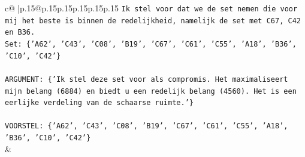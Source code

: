 \documentclass{article}
\begin{document}
{\begin{supertabular}{c@{$\;$}|p{.15\linewidth}@{}p{.15\linewidth}p{.15\linewidth}p{.15\linewidth}p{.15\linewidth}p{.15\linewidth}}
{{{\texttt{Ik stel voor dat we de set nemen die voor mij het beste is binnen de redelijkheid, namelijk de set met C67, C42 en B36.} \\
\texttt{Set: \{'A62', 'C43', 'C08', 'B19', 'C67', 'C61', 'C55', 'A18', 'B36', 'C10', 'C42'\}} \\
\\ 
\texttt{ARGUMENT: \{'Ik stel deze set voor als compromis. Het maximaliseert mijn belang (6884) en biedt u een redelijk belang (4560). Het is een eerlijke verdeling van de schaarse ruimte.'\}} \\
\\ 
\texttt{VOORSTEL: \{'A62', 'C43', 'C08', 'B19', 'C67', 'C61', 'C55', 'A18', 'B36', 'C10', 'C42'\}} \\
            }
        }
    }
    & \\ \\


\end{supertabular}}
\end{document}
